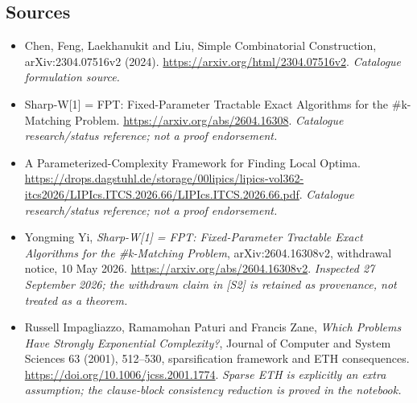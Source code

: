 \documentclass[11pt,a4paper]{article}
\numberwithin{equation}{section}
\begin{document}
\subsection{Sources}
\begin{itemize}\raggedright
\item[\textnormal{[S1]}]\hypertarget{source:statement:1}{} Chen, Feng, Laekhanukit and Liu, Simple Combinatorial Construction, arXiv:2304.07516v2 (2024).
\url{https://arxiv.org/html/2304.07516v2}.
{\small\textit{Catalogue formulation source.}}
\item[\textnormal{[S2]}]\hypertarget{source:statement:2}{} Sharp-W[1] = FPT: Fixed-Parameter Tractable Exact Algorithms for the \#k-Matching Problem.
\url{https://arxiv.org/abs/2604.16308}.
{\small\textit{Catalogue research/status reference; not a proof endorsement.}}
\item[\textnormal{[S3]}]\hypertarget{source:statement:3}{} A Parameterized-Complexity Framework for Finding Local Optima.
\url{https://drops.dagstuhl.de/storage/00lipics/lipics-vol362-itcs2026/LIPIcs.ITCS.2026.66/LIPIcs.ITCS.2026.66.pdf}.
{\small\textit{Catalogue research/status reference; not a proof endorsement.}}
\item[\textnormal{[E1]}]\hypertarget{extra:statement:1}{} Yongming Yi,
\emph{Sharp-W[1] = FPT: Fixed-Parameter Tractable Exact Algorithms for the
\#k-Matching Problem}, arXiv:2604.16308v2, withdrawal notice, 10 May 2026.
\url{https://arxiv.org/abs/2604.16308v2}.
{\small\textit{Inspected 27 September 2026; the withdrawn claim in [S2]
is retained as provenance, not treated as a theorem.}}
\item[\textnormal{[E2]}]\hypertarget{extra:statement:2}{} Russell Impagliazzo,
Ramamohan Paturi and Francis Zane, \emph{Which Problems Have Strongly
Exponential Complexity?}, Journal of Computer and System Sciences 63
(2001), 512--530, sparsification framework and ETH consequences.
\url{https://doi.org/10.1006/jcss.2001.1774}.
{\small\textit{Sparse ETH is explicitly an extra assumption; the
clause-block consistency reduction is proved in the notebook.}}
\end{itemize}
\end{document}
